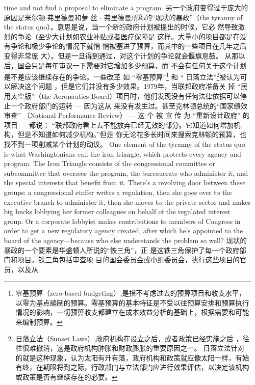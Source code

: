 \begin{paracol}{2}
time and not find a proposal to eliminate a program.
\switchcolumn
另一个政府变得过于庞大的原因是米尔顿$\cdot$弗里德曼和萝
丝 $\cdot$ 弗里德曼所称的“现状的暴政”（the  tyranny of the status quo）。意思是说，当一个新的政府计划被提出的时候，它必
然导致激烈的争论（至少大计划如农业补贴或者医疗保障是
这样。大量小的项目都是在没有争论和极少争论的情况下就悄
悄被塞进了预算，而其中的一些项目在几年之后变得非常庞
大）。但是一旦得到通过，对这个计划的争论就会偃旗息鼓。
从那以后，国会只是每年审议一下需要对它增加多少预算，而
不会有任何关于这个计划是不是应该继续存在的争论。一些改革 如 “零基预算”\footnote{零基预算（zero-based  budgeting）,是指不考虑过去的预算项目和收支水平，以零为基点编制的预算。零基预算的基本特征是不受以往预算安排和预算执行情况的影响，一切预箅收支都建立在成本效益分析的基础上，根据需要和可能来编制预算。} 和 “ 日落立法”\footnote{日落立法（Sunset Laws）,政府机构在设立之后，或者政策已经实施之后 ，往往很难撤消，这是政府机构肿胀和财政膨胀的重要原因之一。 日落立法针对的就是这种现象，认为太阳有升有落，政府机构和政策就应像太阳一样，有始有终，在期限将到之际，行政部门与立法部门应进行效果评估，以决定该机构或政策是否有继续存在的必要。}被认为可以解决这个问题 ，但是它们并没有多少效果。1979年，当联邦政府准备关
掉 “民用太空版”（the  Aeronautics Board）项目时，他们发现没有任何法律依据可以停止一个政府部门的运转 --- 因为这从
来没有发生过。甚至克林顿总统的“国家绩效审查” （Nation­al Performance Review）  --- 这 个 被 宣 传 为 “重新设计政府”
的项目 --- 都说： “联邦政府看上去不能放弃已经无效的部分。它知道如何增加机构，但是不知道如何减少机构。”但是
你无论花多长时间来搜索克林顿的预算，也找不到一项削减某个计划的动议。
\switchcolumn*
One element of the tyranny of the status quo is what Washingtonians call the iron triangle, which protects every agency
and program. The Iron Triangle consists of the congressional
committee or subcommittee that oversees the program, the bureaucrats who administer it, and the special interests that benefit from it. There's a revolving door between these groups: a
congressional staffer writes a regulation, then she goes over to
the executive branch to administer it, then she moves to the private sector and makes big bucks lobbying her former colleagues
on behalf of the regulated interest group. Or a corporate lobbyist makes contributions to members of Congress in order to get
a new regulatory agency created, after which he's appointed to
the board of the agency---because who else understands the
problem so well?
\switchcolumn
现状的暴政的一个要素是华盛顿人所说的“铁三角”，正
是这铁三角保护了每一个政府部门和项目。铁三角包括审查项
目的国会委员会或小组委员会，执行这些项目的官员，以及从

\end{paracol}
